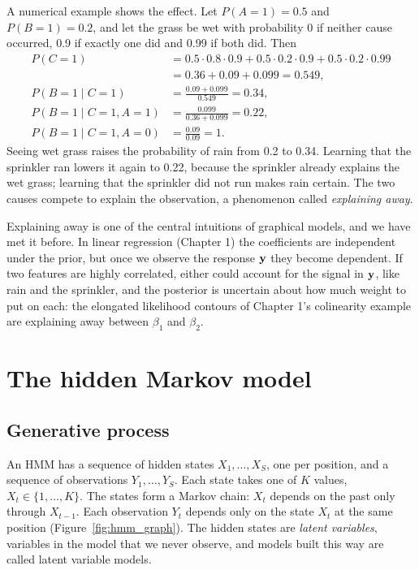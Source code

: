 A numerical example shows the effect. Let $P(A=1)=0.5$ and $P(B=1)=0.2$, and let the grass be wet with probability 0 if neither cause occurred, 0.9 if exactly one did and 0.99 if both did. Then
\begin{align}
  P(C=1) &= 0.5\cdot 0.8\cdot 0.9 + 0.5\cdot 0.2\cdot 0.9 + 0.5\cdot 0.2\cdot 0.99 \nonumber\\ &= 0.36+0.09+0.099 = 0.549, \nonumber\\
  P(B=1\mid C=1) &= \frac{0.09+0.099}{0.549} = 0.34, \nonumber\\
  P(B=1\mid C=1, A=1) &= \frac{0.099}{0.36+0.099} = 0.22, \nonumber\\
  P(B=1\mid C=1, A=0) &= \frac{0.09}{0.09} = 1 .
\end{align}
Seeing wet grass raises the probability of rain from 0.2 to 0.34. Learning that the sprinkler ran lowers it again to 0.22, because the sprinkler already explains the wet grass; learning that the sprinkler did not run makes rain certain. The two causes compete to explain the observation, a phenomenon called \emph{explaining away}.

Explaining away is one of the central intuitions of graphical models, and we have met it before. In linear regression (Chapter 1) the coefficients are independent under the prior, but once we observe the response $\mathbf{y}$ they become dependent. If two features are highly correlated, either could account for the signal in $\mathbf{y}$, like rain and the sprinkler, and the posterior is uncertain about how much weight to put on each: the elongated likelihood contours of Chapter 1's colinearity example are explaining away between $\beta_1$ and $\beta_2$.

\section{The hidden Markov model}
\label{sec:hmm}

\subsection{Generative process}

An HMM has a sequence of hidden states $X_1,\dots,X_S$, one per position, and a sequence of observations $Y_1,\dots,Y_S$. Each state takes one of $K$ values, $X_t\in\{1,\dots,K\}$. The states form a Markov chain: $X_t$ depends on the past only through $X_{t-1}$. Each observation $Y_t$ depends only on the state $X_t$ at the same position (Figure~\ref{fig:hmm_graph}). The hidden states are \emph{latent variables}, variables in the model that we never observe, and models built this way are called latent variable models.

